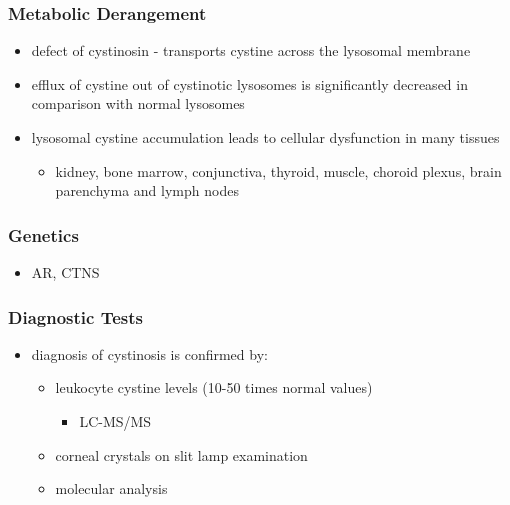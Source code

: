 \documentclass[12pt]{scrartcl}
\begin{document}
\subsubsection{Metabolic Derangement}
\label{sec:org01fd2be}
\begin{itemize}
\item defect of cystinosin - transports cystine across the lysosomal
membrane
\item efflux of cystine out of cystinotic lysosomes is significantly
decreased in comparison with normal lysosomes
\item lysosomal cystine accumulation leads to cellular dysfunction in many
tissues
\begin{itemize}
\item kidney, bone marrow, conjunctiva, thyroid, muscle, choroid plexus,
brain parenchyma and lymph nodes
\end{itemize}
\end{itemize}

\subsubsection{Genetics}
\label{sec:org8f839df}
\begin{itemize}
\item AR, CTNS
\end{itemize}

\subsubsection{Diagnostic Tests}
\label{sec:org78e9b8f}
\begin{itemize}
\item diagnosis of cystinosis is confirmed by:
\begin{itemize}
\item leukocyte cystine levels (10-50 times normal values)
\begin{itemize}
\item LC-MS/MS
\end{itemize}
\item corneal crystals on slit lamp examination
\item molecular analysis
\end{itemize}
\end{itemize}
\end{document}
